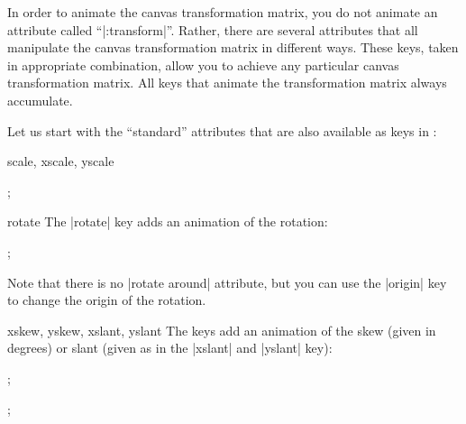 In order to animate the canvas transformation matrix, you do not
animate an attribute called ``|:transform|''. Rather, there are
several attributes that all manipulate the canvas transformation
matrix in different ways. These keys, taken in appropriate
combination, allow you to achieve any particular canvas transformation
matrix. All keys that animate the transformation matrix always
accumulate.

Let us start with the ``standard'' attributes that are also available
as keys in \tikzname: 

\begin{tikzanimateattribute}{scale, xscale, yscale}
\begin{codeexample}[animation list={0.5,1,1.5,2}]
\tikz {}; 
\end{codeexample}
\end{tikzanimateattribute}

\begin{tikzanimateattribute}{rotate}
  The |rotate| key adds an animation of the rotation:
\begin{codeexample}[animation list={0.5,1,1.5,2}]
\tikz {}; 
\end{codeexample}
  Note that there is no |rotate around| attribute, but you can use the
  |origin| key to change the origin of the rotation.
\end{tikzanimateattribute}


\begin{tikzanimateattribute}{xskew, yskew, xslant, yslant}
  The keys add an animation of the skew (given in degrees) or slant
  (given as in the |xslant| and |yslant| key):
\begin{codeexample}[animation list={0.5,1,1.5,2}]
\tikz {}; 
\end{codeexample}
\begin{codeexample}[animation list={0.5,1,1.5,2}]
\tikz {}; 
\end{codeexample}
\end{tikzanimateattribute}

